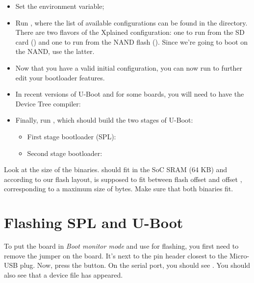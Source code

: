 \begin{itemize}

\item Set the  environment variable;

\item Run , where the list of available
  configurations can be found in the  directory. There
  are two flavors of the Xplained configuration: one to run from the
  SD card () and one to run from the NAND
  flash (). Since we're going to boot
  on the NAND, use the latter.

\item Now that you have a valid initial configuration, you can now
  run  to further edit your bootloader features.

\item In recent versions of U-Boot and for some boards, you will
  need to have the Device Tree compiler:


\item Finally, run , which should build the two stages of U-Boot:
\begin{itemize}
  \item First stage bootloader (SPL): 
  \item Second stage bootloader: 
\end{itemize}

\end{itemize}

Look at the size of the binaries.  should fit
in the SoC SRAM (64 KB) and according to our flash layout, 
is supposed to fit between flash offset  and offset ,
corresponding to a maximum size of  bytes.  Make sure that
both binaries fit.

\section{Flashing SPL and U-Boot}

To put the board in {\em Boot monitor mode} and use  for
flashing, you first need to remove the  jumper on the board.
It's next to the pin header closest to the Micro-USB plug.
Now, press the  button.  On the serial port, you should see
. You should also see that a  device
file has appeared.

